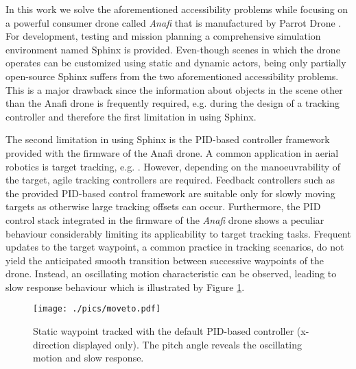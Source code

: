 In this work we solve the aforementioned accessibility problems while focusing on a powerful consumer drone called \textit{Anafi} that is manufactured by Parrot Drone \cite{parrot_drone_sas}. For development, testing and mission planning a comprehensive simulation environment named Sphinx \cite{parrot_sphinx} is provided. Even-though scenes in which the drone operates can be customized using static and dynamic actors, being only partially open-source Sphinx suffers from the two aforementioned accessibility problems. This is a major drawback since the information about objects in the scene other than the Anafi drone is frequently required, e.g. during the design of a tracking controller and therefore the first limitation in using Sphinx. 

The second limitation in using Sphinx is the  PID-based controller framework provided with the firmware of the Anafi drone. A common application in aerial robotics is target tracking, e.g. \cite{tallamraju2018,tallamraju2019}. However, depending on the manoeuvrability of the target, agile tracking controllers are required. Feedback controllers such as the provided PID-based control framework are suitable only for slowly moving targets as otherwise large tracking offsets can occur. Furthermore, the PID control stack integrated in the firmware of the \textit{Anafi} drone shows a peculiar behaviour considerably limiting its applicability to target tracking tasks. Frequent updates to the target waypoint, a common practice in tracking scenarios, do not yield the anticipated smooth transition between successive waypoints of the drone. Instead, an oscillating motion characteristic can be observed, leading to slow response  behaviour which is illustrated by Figure \ref{fig:moveto}.

\begin{figure}[thpb]
      \centering
		\texttt{[image: ./pics/moveto.pdf]}
\caption{Static waypoint tracked with the default PID-based controller (x-direction displayed only). The pitch angle reveals the oscillating motion and slow response. }
\label{fig:moveto}
 \end{figure}

